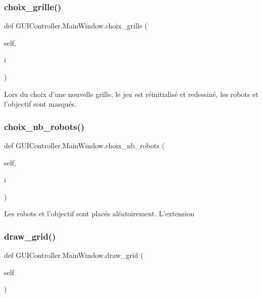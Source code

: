 \subsubsection{\texorpdfstring{choix\+\_\+grille()}{choix\_grille()}}
{\footnotesize\ttfamily def G\+U\+I\+Controller.\+Main\+Window.\+choix\+\_\+grille (\begin{DoxyParamCaption}\item[{}]{self,  }\item[{}]{i }\end{DoxyParamCaption})}

\begin{DoxyVerb}Lors du choix d'une nouvelle grille, le jeu est réinitialisé et redessiné, les robots et l'objectif sont masqués.
\end{DoxyVerb}
 \mbox{\label{classGUIController_1_1MainWindow_a8b3807923fb74d52f7ae9e2ca31021e5}} 
\subsubsection{\texorpdfstring{choix\+\_\+nb\+\_\+robots()}{choix\_nb\_robots()}}
{\footnotesize\ttfamily def G\+U\+I\+Controller.\+Main\+Window.\+choix\+\_\+nb\+\_\+robots (\begin{DoxyParamCaption}\item[{}]{self,  }\item[{}]{i }\end{DoxyParamCaption})}

\begin{DoxyVerb}Les robots et l'objectif sont placés aléatoirement. L'extension
\end{DoxyVerb}
 \mbox{\label{classGUIController_1_1MainWindow_a0161daf1fd6d9c8de52379dbfa3ea17a}} 
\subsubsection{\texorpdfstring{draw\+\_\+grid()}{draw\_grid()}}
{\footnotesize\ttfamily def G\+U\+I\+Controller.\+Main\+Window.\+draw\+\_\+grid (\begin{DoxyParamCaption}\item[{}]{self }\end{DoxyParamCaption})}


